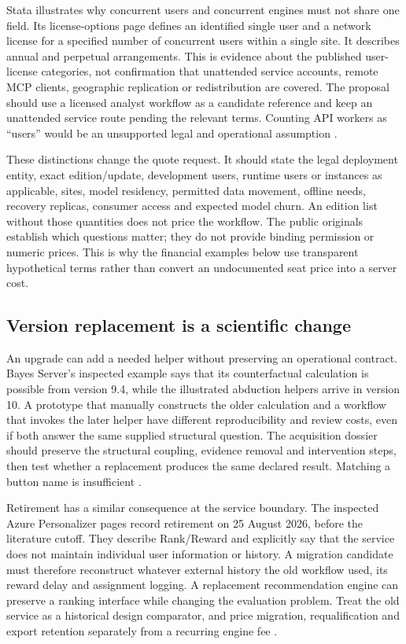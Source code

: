 Stata illustrates why concurrent users and concurrent engines must not share
one field. Its license-options page defines an identified single user and a
network license for a specified number of concurrent users within a single
site. It describes annual and perpetual arrangements. This is evidence about
the published user-license categories, not confirmation that unattended
service accounts, remote MCP clients, geographic replication or redistribution
are covered. The proposal should use a licensed analyst workflow as a
candidate reference and keep an unattended service route pending the relevant
terms. Counting API workers as ``users'' would be an unsupported legal and
operational assumption \citep{exec13_ivrd_license}.

These distinctions change the quote request. It should state the legal
deployment entity, exact edition/update, development users, runtime users or
instances as applicable, sites, model residency, permitted data movement,
offline needs, recovery replicas, consumer access and expected model churn.
An edition list without those quantities does not price the workflow. The
public originals establish which questions matter; they do not provide binding
permission or numeric prices. This is why the financial examples below use
transparent hypothetical terms rather than convert an undocumented seat price
into a server cost.

\subsection{Version replacement is a scientific change}

An upgrade can add a needed helper without preserving an operational contract.
Bayes Server's inspected example says that its counterfactual calculation is
possible from version 9.4, while the illustrated abduction helpers arrive in
version 10. A prototype that manually constructs the older calculation and a
workflow that invokes the later helper have different reproducibility and
review costs, even if both answer the same supplied structural question.
The acquisition dossier should preserve the structural coupling, evidence
removal and intervention steps, then test whether a replacement produces the
same declared result. Matching a button name is insufficient
\citep{exec13_ci_bayesserver_causality}.

Retirement has a similar consequence at the service boundary. The inspected
Azure Personalizer pages record retirement on 25 August 2026, before the
literature cutoff. They describe Rank/Reward and explicitly say that the service
does not maintain individual user information or history. A migration candidate
must therefore reconstruct whatever external history the old workflow used,
its reward delay and assignment logging. A replacement recommendation engine
can preserve a ranking interface while changing the evaluation problem. Treat
the old service as a historical design comparator, and price migration,
requalification and export retention separately from a recurring engine fee
\citep{exec16_cp_azure}.

